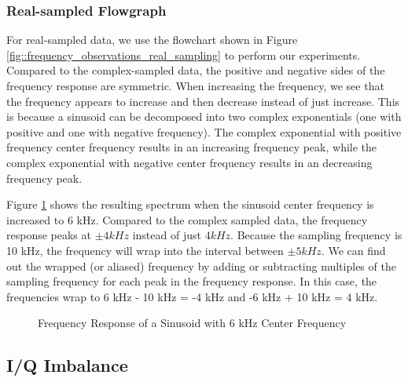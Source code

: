 \documentclass{article}
\begin{document}
\subsubsection{Real-sampled Flowgraph}

For real-sampled data, we use the flowchart shown in Figure \ref{fig::frequency_observations_real_sampling} to perform our experiments. Compared to the complex-sampled data, the positive and negative sides of the frequency response are symmetric. When increasing the frequency, we see that the frequency appears to increase and then decrease instead of just increase. This is because a sinusoid can be decomposed into two complex exponentials (one with positive and one with negative frequency). The complex exponential with positive frequency center frequency results in an increasing frequency peak, while the complex exponential with negative center frequency results in an decreasing frequency peak.

Figure \ref{fig::freq_observations_real_6k_center_freq} shows the resulting spectrum when the sinusoid center frequency is increased to 6 kHz. Compared to the complex sampled data, the frequency response peaks at $\pm 4 kHz$ instead of just $4 kHz$. Because the sampling frequency is 10 kHz, the frequency will wrap into the interval between $\pm 5 kHz$. We can find out the wrapped (or aliased) frequency by adding or subtracting multiples of the sampling frequency for each peak in the frequency response. In this case, the frequencies wrap to 6 kHz - 10 kHz = -4 kHz and -6 kHz + 10 kHz = 4 kHz. 

\begin{figure}[H]
	\centerline{}
	\caption{Frequency Response of a Sinusoid with 6 kHz Center Frequency}
	\label{fig::freq_observations_real_6k_center_freq}
\end{figure}

\subsection{I/Q Imbalance}
\end{document}
